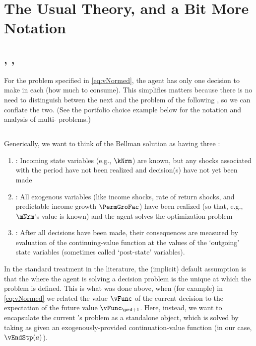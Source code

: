 \documentclass[\econtexRoot/SolvingMicroDSOPs]{subfiles}
\begin{document}
\hypertarget{the-usual-theory}{}
\section{The Usual Theory, and a Bit More Notation}\label{sec:the-usual-theory}


\subsection{\Intervals, \Stgs, \Moves}

For the problem specified in \eqref{eq:vNormed}, the agent has only one decision to make in each {\interval} (how much to consume). %
This simplifies matters because there is no need to distinguish betwen the next {\stg} and the problem of the following {\interval}, so we can conflate the two.  (See the portfolio choice example below for the notation and analysis of multi-{\stg} problems.)

\subsection{\Moves}

Generically, we want to think of the Bellman solution as having three {\moves}:
\begin{enumerate}
\item \textbf{\Arrival}: Incoming state variables (e.g., $\kNrm$) are known, but any shocks associated with the period have not been realized and decision(s) have not yet been made
\item \textbf{\Decision}: All exogenous variables (like income shocks, rate of return shocks, and predictable income growth $\PermGroFac$) have been realized (so that, e.g., $\mNrm$'s value is known) and the agent solves the optimization problem
\item \textbf{\Continuation}: After all decisions have been made, their consequences are measured by evaluation of the continuing-value function at the values of the `outgoing' state variables (sometimes called `post-state' variables).
\end{enumerate}

In the standard treatment in the literature, the (implicit) default assumption is that the {\move} where the agent is solving a decision problem is the unique {\move} at which the problem is defined.  This is what was done above, when (for example) in \eqref{eq:vNormed} we related the value $\vFunc$ of the current decision to the expectation of the future value $\vFunc_{\prd+1}$.  Here, instead, we want to encapsulate the current {\stg}'s problem as a standalone object, which is solved by taking as given an exogenously-provided continuation-value function (in our case, $\vEndStp(a)$).
\end{document}
